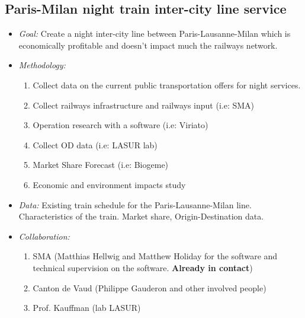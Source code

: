 \documentclass[helv,dvipsnames]{apa7}
\begin{document}
\subsection{Paris-Milan night train inter-city line service}
\begin{itemize}
    \itemsep0mm
    \item \textit{Goal:} Create a night inter-city line between Paris-Lausanne-Milan which is economically profitable and doesn't impact much the railways network.
    \item \textit{Methodology:} 
    \begin{enumerate}
    \itemsep 0mm
        \item Collect data on the current public transportation offers for night services.
        \item Collect railways infrastructure and railways input (i.e: SMA)
        \item Operation research with a software (i.e: Viriato)
        \item Collect OD data (i.e: LASUR lab)
        \item Market Share Forecast (i.e: Biogeme)
        \item Economic and environment impacts study
    \end{enumerate}
    \item \textit{Data:} Existing train schedule for the Paris-Lausanne-Milan line. Characteristics of the train. Market share, Origin-Destination data.
    \item \textit{Collaboration:}
    \begin{enumerate}
        \itemsep 0mm
        \item SMA (Matthias Hellwig and Matthew Holiday for the software and technical supervision on the software. \textbf{Already  in contact})
        \item Canton de Vaud (Philippe Gauderon and other involved people)
        \item Prof. Kauffman (lab LASUR)
    \end{enumerate}
\end{itemize}
\end{document}
